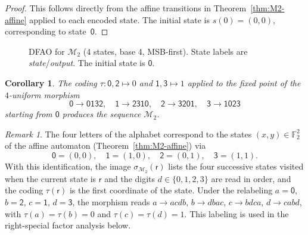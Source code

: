 \documentclass[12pt,reqno]{article}
\theoremstyle{plain}
\newtheorem{corollary}[theorem]{Corollary}
\theoremstyle{definition}
\theoremstyle{remark}
\newtheorem{remark}[theorem]{Remark}
\begin{document}
\begin{proof}
 This follows directly from the affine transitions in Theorem~\ref{thm:M2-affine} applied to each encoded state. The initial state is $s(0) 
 = (0,0)$, corresponding to state~$\mathsf{0}$.
\end{proof}

\begin{figure}[ht]
\centering
{}
\caption{DFAO for $\mathcal{M}_{2}$ (4 states, base 4, MSB-first). State labels are \emph{state}/\emph{output}. The initial 
 state is $\mathsf{0}$.} 
\end{figure}

\begin{corollary}\label{cor:M2-morphism} 
The coding $\tau\colon \mathsf{0},\mathsf{2} \mapsto 0$ and $\mathsf{1},\mathsf{3} \mapsto 1$ applied 
 to the fixed point of the $4$-uniform morphism
\[
 \mathsf{0} \to \mathsf{0132}, \quad
 \mathsf{1} \to \mathsf{2310}, \quad
 \mathsf{2} \to \mathsf{3201}, \quad
 \mathsf{3} \to \mathsf{1023}
\]
starting from $\mathsf{0}$ produces the sequence $\mathcal{M}_{2}$.
\end{corollary}

\begin{remark}
 The four letters of the alphabet correspond to the states $(x,y)\in\mathbb{F}_2^2$ of the affine automaton 
 (Theorem~\ref{thm:M2-affine}) via $$ \mathsf{0} = (0,0),\quad \mathsf{1} = (1,0),\quad \mathsf{2} = (0,1),\quad 
 \mathsf{3} = (1,1). $$
 With this identification, the image $\sigma_{\mathcal{M}_{2}}(\mathsf{r})$ lists the four
 successive states visited when the current state is $\mathsf{r}$ and the digits
 $d\in\{0,1,2,3\}$ are read in order, and the coding $\tau(\mathsf{r})$ is the first
 coordinate of the state. Under the relabeling $a=\mathsf{0}$, $b=\mathsf{2}$, $c=\mathsf{1}$,
 $d=\mathsf{3}$, the morphism reads $a\to acdb$, $b\to dbac$, $c\to bdca$, $d\to cabd$, with
 $\tau(a)=\tau(b)=0$ and $\tau(c)=\tau(d)=1$. This labeling is used in the right-special
 factor analysis below.
\end{remark}
\end{document}

